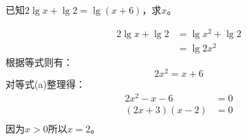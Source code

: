 \documentclass[answers]{exam}
\begin{document}
\begin{questions}
	\question 已知$2\lg{x} + \lg{2} = \lg(x+6)$，求$x$。
	\begin{solution}
		\begin{align*}
			2\lg{x} + \lg2 & = \lg{x^2} + \lg2 \\
			               & = \lg{2x^2}
		\end{align*}
		根据等式则有：
		\begin{equation*}
			2x^2 = x + 6 \tag{a}
		\end{equation*}
		对等式(a)整理得：
		\begin{align*}
			2x^2 - x - 6  & = 0 \\
			(2x + 3)(x-2) & = 0 \\
		\end{align*}
		因为$x>0$所以$x=2$。
	\end{solution}

\end{questions}
\end{document}
